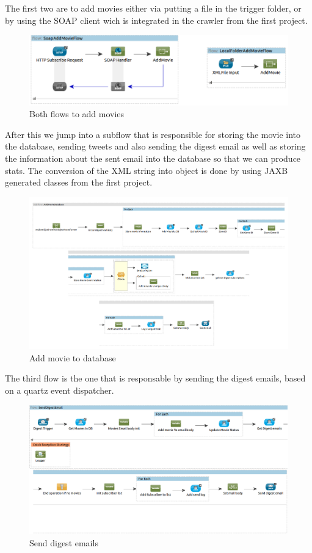 \documentclass[12pt]{article}
\begin{document}
The first two are to add movies either via putting a file in the trigger folder, or by using the SOAP client wich is integrated in the crawler from the first project.

\begin{figure}[h!]
	\centering
	\includegraphics[width=\textwidth]{addFlows.png}
	\caption{Both flows to add movies}
\end{figure}

After this we jump into a subflow that is responsible for storing the movie into the database, sending tweets and also sending the digest email as well as storing the information about the sent email into the database so that we can produce stats.
The conversion of the XML string into object is done by using JAXB generated classes from the first project.

\begin{figure}[h!]
	\centering
	\includegraphics[width=\textwidth]{AddMovieDatabase.png}
	\caption{Add movie to database}
\end{figure}
\clearpage

The third flow is the one that is responsable by sending the digest emails, based on a quartz event dispatcher.

\begin{figure}[h!]
	\centering
	\includegraphics[width=\textwidth]{SendDigestEmail.png}
	\caption{Send digest emails}
\end{figure}
\clearpage
\end{document}
